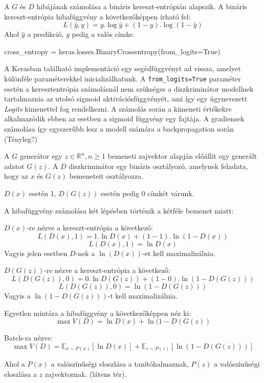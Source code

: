 
A $G$ és $D$ hibájának számolása a bináris kereszt-entrópián alapszik.
A bináris kereszt-entrópia hibafüggvény a következőképpen írható fel:
$$L(\hat y, y) = y . \log \hat y + (1-y). \log (1 - \hat y)$$
Ahol $\hat y$ a predikció, $y$ pedig a valós címke.

\begin{python}
cross_entropy = keras.losses.BinaryCrossentropy(from_logits=True)
\end{python}

A Kerasban található implementáció egy segédfüggvényt ad vissza, amelyet különféle paraméterekkel inicializálhatunk. A \texttt{from\_logits=True} paraméter esetén a keresztentrópia számolásnál nem szükséges a diszkriminátor modellnek tartalmaznia az utolsó sigmoid aktivációsfüggvényét, ami így egy úgynevezett \textit{Logits} kimenettel fog rendelkezni. A számolás során a kimeneti értékekre alkalmazódik ebben az esetben a sigmoid függvény egy fajtája. A gradiensek számolása így egyszerűbb lesz a modell számára a backpropagation során (Tényleg?)


A $G$ generátor egy $z \in \mathbb{R}^n, n \geq 1$ bemeneti zajvektor alapján előállít egy generált adatot $G(z)$.
A $D$ diszkriminátor egy bináris osztályozó, amelynek feladata, hogy az $x$ és $G(z)$ bemeneteit osztályozza.

$D(x)$ esetén 1, $D(G(z))$ esetén pedig 0 címkét várunk.

A hibafüggvény számolása két lépésben történik a kétféle bemenet miatt:

$D(x)$-re nézve a kereszt-entrópia a következő:
$$L(D(x), 1) = 1.\ln D(x) + (1 - 1).\ln(1 - D(x))$$
$$L(D(x), 1) = \ln D(x)$$
Vagyis jelen esetben $D$-nek a $\ln(D(x))$-et kell maximalizálnia.

$D(G(z))$-re nézve a kereszt-entrópia a következő:
$$L(D(G(z)), 0) = 0.\ln D(G(z)) + (1 - 0).\ln(1 - D(G(z)))$$
$$L(D(G(z)), 0) = \ln(1- D(G(z)))$$
Vagyis a $\ln(1 - D(G(z)))$-t kell maximalizálnia.

Egyetlen mintára a hibafüggvény a következőképpen néz ki:
$$\max V(D) = \ln D(x) + \ln(1 - D(G(z))$$

Batch-ra nézve:
$$\max V(D) = \mathbb{E}_{x \sim P(x)} \left[\ln D(x) \right] + \mathbb{E}_{z \sim P(z)} \left[\ln(1 - D(G(z))) \right]$$

Ahol a $P(x)$ a valószínűségi eloszlása a tanítóhalmaznak, $P(z)$ a valószínűségi eloszlása a $z$ zajvektornak. (látens tér).

